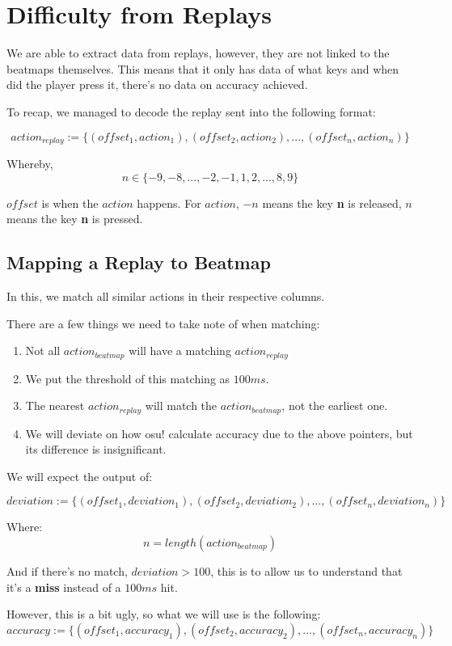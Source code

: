 
\section{Difficulty from Replays}

We are able to extract data from replays, however, they are not linked to the beatmaps themselves. This means that it only has data of what keys and when did the player press it, there's no data on accuracy achieved.

To recap, we managed to decode the replay sent into the following format:

$$ action_{replay} := \lbrace(offset_1, action_1), (offset_2, action_2), ... , (offset_n, action_n)\rbrace $$

Whereby, 
$$n \in \lbrace-9, -8, ... , -2, -1, 1, 2, ... , 8, 9\rbrace$$

$offset$ is when the $action$ happens. For $action$, $-n$ means the key \textbf{n} is released, $n$ means the key \textbf{n} is pressed.

\subsection{Mapping a Replay to Beatmap}

In this, we match all similar actions in their respective columns.

There are a few things we need to take note of when matching:
\begin{enumerate}
	\item Not all $action_{beatmap}$ will have a matching $action_{replay}$
	\item We put the threshold of this matching as $100ms$.
	\item The nearest $action_{replay}$ will match the $action_{beatmap}$, not the earliest one.
	\item We will deviate on how osu! calculate accuracy due to the above pointers, but its difference is insignificant.
\end{enumerate}

We will expect the output of:

$$ deviation := \lbrace(offset_1, deviation_1), (offset_2, deviation_2), ..., (offset_n, deviation_n)\rbrace $$

Where:
$$ n = length(action_{beatmap}) $$

And if there's no match, $deviation > 100$, this is to allow us to understand that it's a \textbf{miss} instead of a $100ms$ hit.

However, this is a bit ugly, so what we will use is the following:
$$ accuracy := \lbrace(offset_1, accuracy_1), (offset_2, accuracy_2), ..., (offset_n, accuracy_n)\rbrace $$

